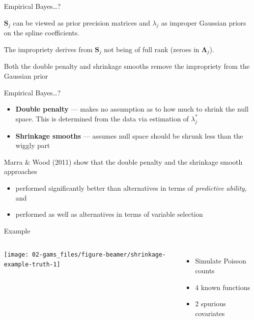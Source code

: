 \documentclass[10pt,ignorenonframetext,compress, aspectratio=169]{beamer}
\providecommand{\tightlist}{%
  \setlength{\itemsep}{0pt}\setlength{\parskip}{0pt}}
\newcommand{\columnsbegin}{\begin{columns}}
\newcommand{\columnsend}{\end{columns}}
\begin{document}
\begin{frame}{Empirical Bayes\ldots{}?}

\(\mathbf{S}_j\) can be viewed as prior precision matrices and
\(\lambda_j\) as improper Gaussian priors on the spline coefficients.

The impropriety derives from \(\mathbf{S}_j\) not being of full rank
(zeroes in \(\boldsymbol{\Lambda}_j\)).

Both the double penalty and shrinkage smooths remove the impropriety
from the Gaussian prior

\end{frame}

\begin{frame}{Empirical Bayes\ldots{}?}

\begin{itemize}
\tightlist
\item
  \textbf{Double penalty} --- makes no assumption as to how much to
  shrink the null space. This is determined from the data via estimation
  of \(\lambda_j^{*}\)
\item
  \textbf{Shrinkage smooths} --- assumes null space should be shrunk
  less than the wiggly part
\end{itemize}

Marra \& Wood (2011) show that the double penalty and the shrinkage
smooth approaches

\begin{itemize}
\tightlist
\item
  performed significantly better than alternatives in terms of
  \emph{predictive ability}, and
\item
  performed as well as alternatives in terms of variable selection
\end{itemize}

\end{frame}

\begin{frame}{Example}

\columnsbegin
{}

\begin{center}\texttt{[image: 02-gams\_files/figure-beamer/shrinkage-example-truth-1]} \end{center}


\begin{itemize}
\tightlist
\item
  Simulate Poisson counts
\item
  4 known functions
\item
  2 spurious covariates
\end{itemize}

\columnsend

\end{frame}
\end{document}
